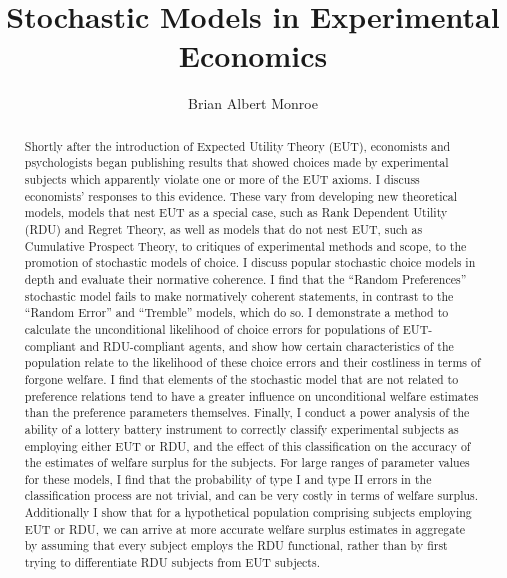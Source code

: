\documentclass[11pt,a4paper,notitlepage]{report}
\title{Stochastic Models in Experimental Economics}
\author{Brian Albert Monroe}
\begin{document}
\maketitle{}

\doublespacing

\begin{abstract}

Shortly after the introduction of Expected Utility Theory (EUT), economists and psychologists began publishing results that showed choices made by experimental subjects which apparently violate one or more of the EUT axioms.
I discuss economists' responses to this evidence.
These vary from developing new theoretical models, models that nest EUT as a special case, such as Rank Dependent Utility (RDU) and Regret Theory, as well as models that do not nest EUT, such as Cumulative Prospect Theory, to critiques of experimental methods and scope, to the promotion of stochastic models of choice.
I discuss popular stochastic choice models in depth and evaluate their normative coherence.
I find that the \enquote{Random Preferences} stochastic model fails to make normatively coherent statements, in contrast to the \enquote{Random Error} and \enquote{Tremble} models, which do so.
I demonstrate a method to calculate the unconditional likelihood of choice errors for populations of EUT-compliant and RDU-compliant agents, and show how certain characteristics of the population relate to the likelihood of these choice errors and their costliness in terms of forgone welfare.
I find that elements of the stochastic model that are not related to preference relations tend to have a greater influence on unconditional welfare estimates than the preference parameters themselves.
Finally, I conduct a power analysis of the ability of a lottery battery instrument to correctly classify experimental subjects as employing either EUT or RDU, and the effect of this classification on the accuracy of the estimates of welfare surplus for the subjects.
For large ranges of parameter values for these models, I find that the probability of type I and type II errors in the classification process are not trivial, and can be very costly in terms of welfare surplus.
Additionally I show that for a hypothetical population comprising subjects employing EUT or RDU, we can arrive at more accurate welfare surplus estimates in aggregate by assuming that every subject employs the RDU functional, rather than by first trying to differentiate RDU subjects from EUT subjects.

\end{abstract}
\end{document}
